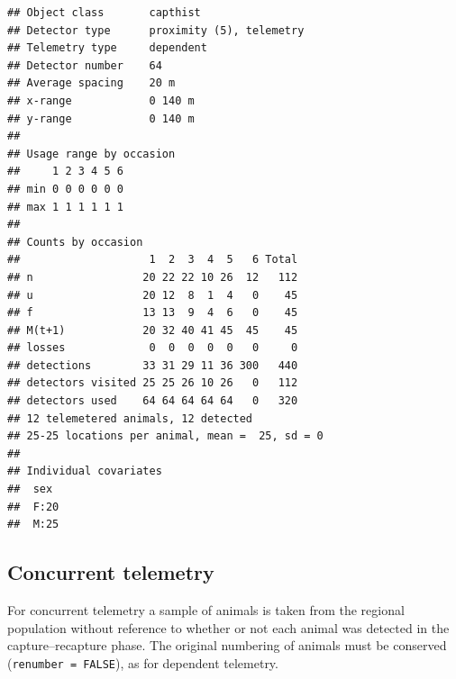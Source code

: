 \documentclass[
]{book}
\begin{document}
\begin{verbatim}
## Object class       capthist 
## Detector type      proximity (5), telemetry 
## Telemetry type     dependent 
## Detector number    64 
## Average spacing    20 m 
## x-range            0 140 m 
## y-range            0 140 m 
## 
## Usage range by occasion
##     1 2 3 4 5 6
## min 0 0 0 0 0 0
## max 1 1 1 1 1 1
## 
## Counts by occasion 
##                    1  2  3  4  5   6 Total
## n                 20 22 22 10 26  12   112
## u                 20 12  8  1  4   0    45
## f                 13 13  9  4  6   0    45
## M(t+1)            20 32 40 41 45  45    45
## losses             0  0  0  0  0   0     0
## detections        33 31 29 11 36 300   440
## detectors visited 25 25 26 10 26   0   112
## detectors used    64 64 64 64 64   0   320
## 12 telemetered animals, 12 detected
## 25-25 locations per animal, mean =  25, sd = 0 
## 
## Individual covariates
##  sex   
##  F:20  
##  M:25
\end{verbatim}

\subsection{Concurrent telemetry}\label{concurrent-telemetry}

For concurrent telemetry a sample of animals is taken from the regional population without reference to whether or not each animal was detected in the capture--recapture phase. The original numbering of animals must be conserved (\texttt{renumber\ =\ FALSE}), as for dependent telemetry.
\end{document}
